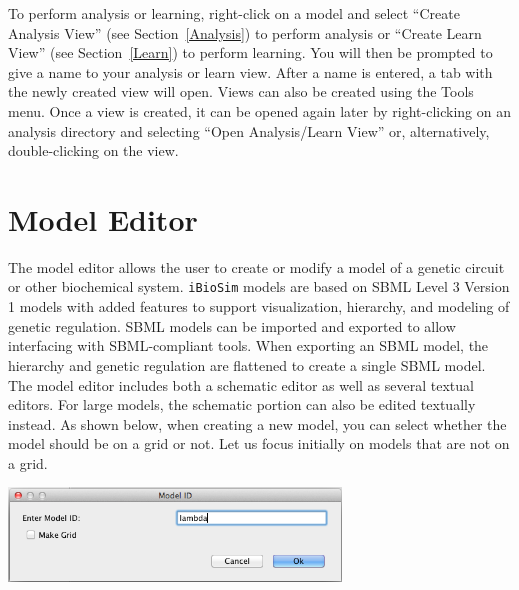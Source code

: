 \documentclass[titlepage,11pt]{article}
\begin{document}


\noindent
To perform analysis or learning, right-click on a model and select ``Create Analysis View'' (see Section~\ref{Analysis}) to perform analysis or ``Create Learn View'' (see Section~\ref{Learn}) to perform learning. You will then be prompted to give a name to your analysis or learn view. After a name is entered, a tab with the newly created view will open.  Views can also be created using the Tools menu.  Once a view is created, it can be opened again later by right-clicking on an analysis directory and selecting ``Open Analysis/Learn View'' or, alternatively, double-clicking on the view.


\clearpage

\section{\label{ModelEdit}Model Editor}

\noindent
The model editor allows the user to create or modify a model of a genetic circuit or other biochemical system.  {\tt iBioSim} models are based on SBML Level 3 Version 1 models with added features to support visualization, hierarchy, and modeling of genetic regulation.  SBML models can be imported and exported to allow interfacing with SBML-compliant tools.  When exporting an SBML model, the hierarchy and genetic regulation are flattened to create a single SBML model.  The model editor includes both a schematic editor as well as several textual editors.  For large models, the schematic portion can also be edited textually instead.  As shown below, when creating a new model, you can select whether the model should be on a grid or not.  Let us focus initially on models that are not on a grid.

\begin{center}
\includegraphics[height=25mm]{screenshots/ModelId}
\end{center}
\end{document}
